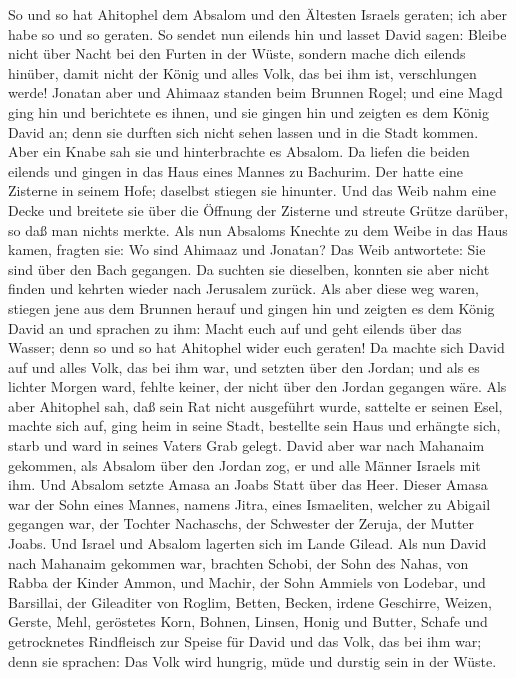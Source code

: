So und so hat Ahitophel dem Absalom und den Ältesten Israels geraten;
ich aber habe so und so geraten.  So sendet nun eilends
hin und lasset David sagen: Bleibe nicht über Nacht bei den Furten in
der Wüste, sondern mache dich eilends hinüber, damit nicht der König und
alles Volk, das bei ihm ist, verschlungen werde!  Jonatan
aber und Ahimaaz standen beim Brunnen Rogel; und eine Magd ging hin und
berichtete es ihnen, und sie gingen hin und zeigten es dem König David
an; denn sie durften sich nicht sehen lassen und in die Stadt kommen.
 Aber ein Knabe sah sie und hinterbrachte es Absalom. Da
liefen die beiden eilends und gingen in das Haus eines Mannes zu
Bachurim. Der hatte eine Zisterne in seinem Hofe; daselbst stiegen sie
hinunter.  Und das Weib nahm eine Decke und breitete sie
über die Öffnung der Zisterne und streute Grütze darüber, so daß man
nichts merkte.  Als nun Absaloms Knechte zu dem Weibe in
das Haus kamen, fragten sie: Wo sind Ahimaaz und Jonatan? Das Weib
antwortete: Sie sind über den Bach gegangen. Da suchten sie dieselben,
konnten sie aber nicht finden und kehrten wieder nach Jerusalem zurück.
 Als aber diese weg waren, stiegen jene aus dem Brunnen
herauf und gingen hin und zeigten es dem König David an und sprachen zu
ihm: Macht euch auf und geht eilends über das Wasser; denn so und so hat
Ahitophel wider euch geraten!  Da machte sich David auf
und alles Volk, das bei ihm war, und setzten über den Jordan; und als es
lichter Morgen ward, fehlte keiner, der nicht über den Jordan gegangen
wäre.  Als aber Ahitophel sah, daß sein Rat nicht
ausgeführt wurde, sattelte er seinen Esel, machte sich auf, ging heim in
seine Stadt, bestellte sein Haus und erhängte sich, starb und ward in
seines Vaters Grab gelegt.  David aber war nach Mahanaim
gekommen, als Absalom über den Jordan zog, er und alle Männer Israels
mit ihm.  Und Absalom setzte Amasa an Joabs Statt über
das Heer. Dieser Amasa war der Sohn eines Mannes, namens Jitra, eines
Ismaeliten, welcher zu Abigail gegangen war, der Tochter Nachaschs, der
Schwester der Zeruja, der Mutter Joabs.  Und Israel und
Absalom lagerten sich im Lande Gilead.  Als nun David
nach Mahanaim gekommen war, brachten Schobi, der Sohn des Nahas, von
Rabba der Kinder Ammon, und Machir, der Sohn Ammiels von Lodebar, und
Barsillai, der Gileaditer von Roglim,  Betten, Becken,
irdene Geschirre, Weizen, Gerste, Mehl, geröstetes Korn, Bohnen, Linsen,
 Honig und Butter, Schafe und getrocknetes Rindfleisch
zur Speise für David und das Volk, das bei ihm war; denn sie sprachen:
Das Volk wird hungrig, müde und durstig sein in der Wüste.

